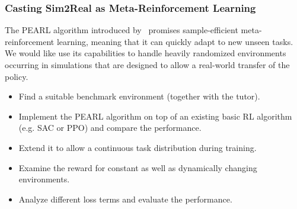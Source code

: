 \documentclass[a4paper]{article}
\begin{document}
\subsubsection{Casting Sim2Real as Meta-Reinforcement Learning}
The PEARL algorithm introduced by~\citet{rakelly2019} promises sample-efficient meta-reinforcement learning, meaning that it can quickly adapt to new unseen tasks. We would like use its capabilities to handle heavily randomized environments occurring in simulations that are designed to allow a real-world transfer of the policy.
\begin{itemize}
  \item Find a suitable benchmark environment (together with the tutor).
  \item Implement the PEARL algorithm on top of an existing basic RL algorithm (e.g. SAC or PPO) and compare the performance.
  \item Extend it to allow a continuous task distribution during training.
  \item Examine the reward for constant as well as dynamically changing environments.
  \item Analyze different loss terms and evaluate the performance.
\end{itemize}









\end{document}
